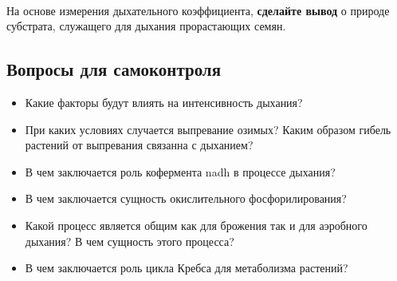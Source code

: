 \paragraph*{}На основе измерения дыхательного коэффициента, \textbf{сделайте вывод} о природе субстрата, служащего для дыхания прорастающих семян.

\subsection*{Вопросы для самоконтроля}

\begin{itemize}
	\item Какие факторы будут влиять на интенсивность дыхания?
	\item При каких условиях случается выпревание озимых? Каким образом гибель растений от выпревания связанна с дыханием?
	\item В чем заключается роль кофермента \gls{nadh} в процессе дыхания?
	\item В чем заключается сущность окислительного фосфорилирования?
	\item Какой процесс является общим как для брожения так и для аэробного дыхания? В чем сущность этого процесса?
	\item В чем заключается роль цикла Кребса для метаболизма растений?
\end{itemize}





